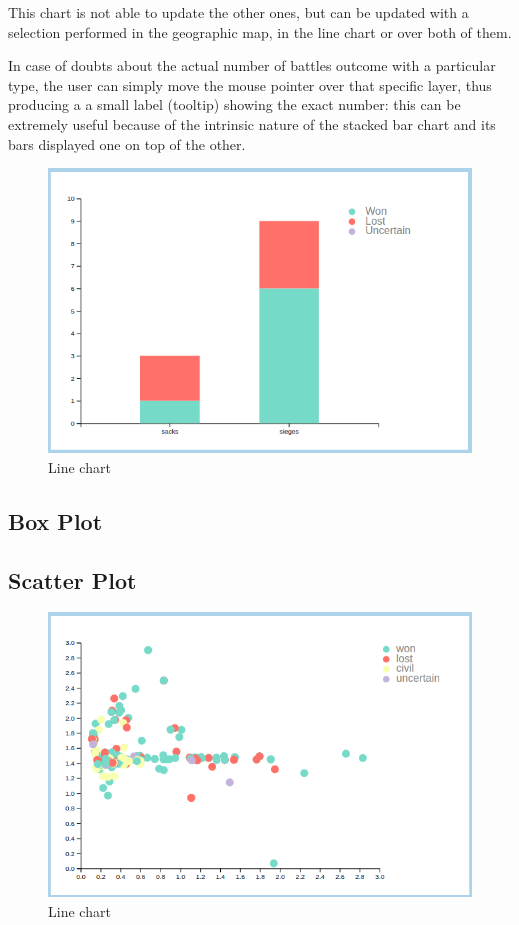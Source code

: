 This chart is not able to update the other ones, but can be updated with a selection performed in the geographic map, in the line chart or over both of them.

In case of doubts about the actual number of battles outcome with a particular type, the user can simply move the mouse pointer over that specific layer, thus producing a a small label (tooltip) showing the exact number: this can be extremely useful because of the intrinsic nature of the stacked bar chart and its bars displayed one on top of the other.
\begin{figure}[h]
\centering
\includegraphics[scale=0.30]{./images/stacked_bar_chart.png}
\caption{Line chart}
\end{figure}

\subsection{Box Plot}

\subsection{Scatter Plot}

\begin{figure}[h]
\centering
\includegraphics[scale=0.30]{./images/scatter_plot.png}
\caption{Line chart}
\end{figure}

